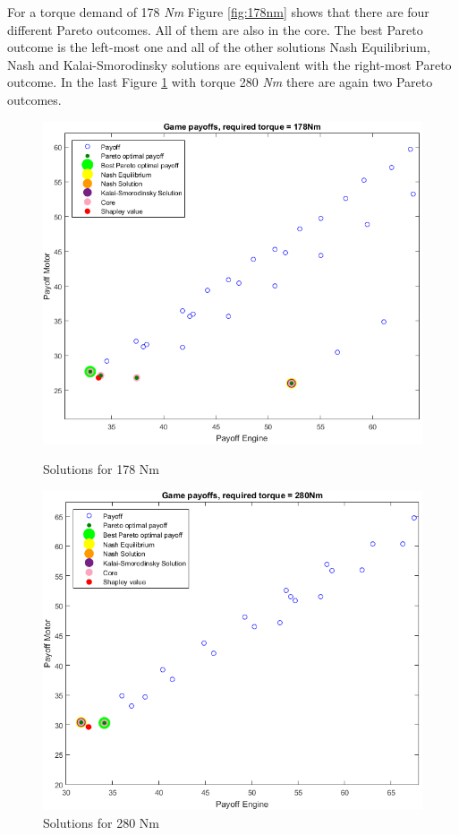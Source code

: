 For a torque demand of 178 \textit{Nm} Figure \ref{fig:178nm} shows that there are four different Pareto outcomes. All of them are also in the core. The best Pareto outcome is the left-most one and all of the other solutions Nash Equilibrium, Nash and Kalai-Smorodinsky solutions are equivalent with the right-most Pareto outcome. In the last Figure \ref{fig:280nm} with torque 280 \textit{Nm} there are again two Pareto outcomes.

\begin{figure}[h]
\centering
\begin{minipage}{.5\textwidth}
 	\centering
	\includegraphics[scale=0.395]{figures/gametheory/178nm}
	\caption{Solutions for 178 Nm}
	\label{fig:178nm}
\end{minipage}%
\begin{minipage}{.5\textwidth}
  	\centering
	\includegraphics[scale=0.405]{figures/gametheory/280nm}
  	\caption{Solutions for 280 Nm}
  	\label{fig:280nm}
\end{minipage}
\end{figure}

